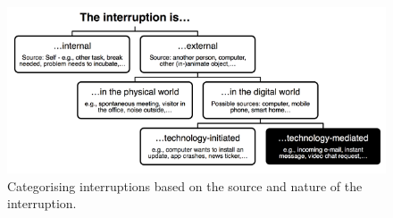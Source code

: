 \documentclass{CML_Seminar_Template}
\begin{document}
\begin{figure}[htb]
  \begin{center}
   \includegraphics{interruption_definition_small.PNG}
  \end{center}
    \caption{\label{interruptions_fig}  Categorising interruptions based on the source and nature of the interruption. \cite[]{Fetter2018}}
\end{figure}
\end{document}
